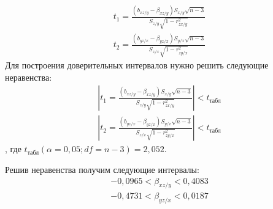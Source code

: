 \documentclass[utf8, a4paper, 14pt, russian, oneside]{book}
\begin{document}
\begin{gather*}
    t_1=\frac{
        (b_{xz/y}-\beta_{xz/y})S_{x/y}\sqrt{n-3}
    }{
        S_{z/y}\sqrt{1-r_{zx/y}^2}
    } \\
    t_2=\frac{
        (b_{yz/x}-\beta_{yz/x})S_{y/x}\sqrt{n-3}
    }{
        S_{z/x}\sqrt{1-r_{zy/x}^2}
    }
\end{gather*}
Для построения доверительных интервалов нужно решить следующие
неравенства:
\begin{gather*}
\left|t_1=\frac{(b_{xz/y}-\beta_{xz/y})S_{x/y}\sqrt{n-3}}{S_{z/y}\sqrt{1-r_{zx/y}^2}}\right|<t_{\text{табл}} \\
\left|t_2=\frac{(b_{yz/x}-\beta_{yz/x})S_{y/x}\sqrt{n-3}}{S_{z/x}\sqrt{1-r_{zy/x}^2}}\right|<t_{\text{табл}}
\end{gather*}
, где $t_{\text{табл}}(\alpha = 0,05;df=n-3)=2,052$.

Решив неравенства получим следующие интервалы:
\begin{gather*}
    -0,0965 < \beta_{xz/y} < 0,4083 \\
    -0,4731 < \beta_{yz/x} < 0,0187
\end{gather*}
\end{document}
